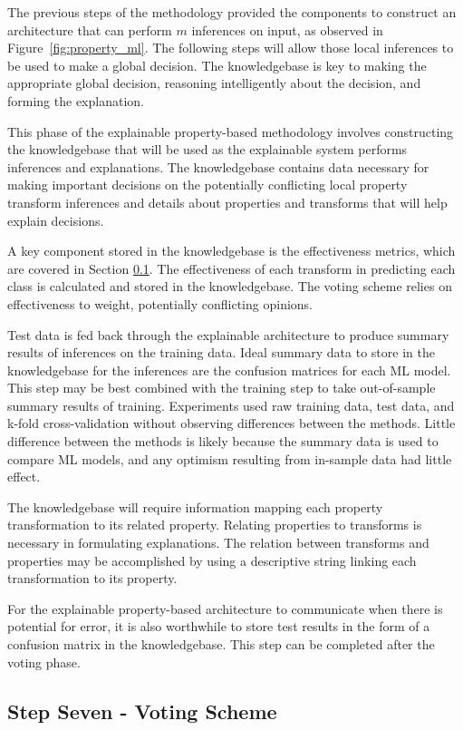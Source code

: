 The previous steps of the methodology provided the components to construct an
architecture that can perform $m$ inferences on input, as observed in
Figure~\ref{fig:property_ml}. The following steps will allow those local
inferences to be used to make a global decision. The knowledgebase is key to
making the appropriate global decision, reasoning intelligently about the
decision, and forming the explanation.

This phase of the explainable property-based methodology involves constructing
the knowledgebase that will be used as the explainable system performs
inferences and explanations. The knowledgebase contains data necessary for
making important decisions on the potentially conflicting local property
transform inferences and details about properties and transforms that will help
explain decisions.

A key component stored in the knowledgebase is the effectiveness metrics, which
are covered in Section \ref{voting_schme}. The effectiveness of each transform
in predicting each class is calculated and stored in the knowledgebase. The
voting scheme relies on effectiveness to weight, potentially conflicting
opinions.

Test data is fed back through the explainable architecture to produce summary
results of inferences on the training data. Ideal summary data to store in the
knowledgebase for the inferences are the confusion matrices for each ML model.
This step may be best combined with the training step to take out-of-sample
summary results of training. Experiments used raw training data, test data, and
k-fold cross-validation without observing differences between the methods.
Little difference between the methods is likely because the summary data is used
to compare ML models, and any optimism resulting from in-sample data had little
effect. 

The knowledgebase will require information mapping each property transformation
to its related property. Relating properties to transforms is necessary in
formulating explanations. The relation between transforms and properties may be
accomplished by using a descriptive string linking each transformation to its
property.

For the explainable property-based architecture to communicate when there is
potential for error, it is also worthwhile to store test results in the form of
a confusion matrix in the knowledgebase. This step can be completed after the
voting phase.

\subsection{Step Seven - Voting Scheme} %
\label{voting_schme}

